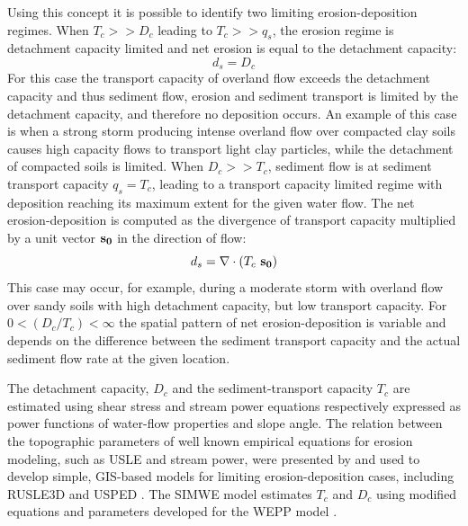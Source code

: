 \documentclass[gmd, manuscript]{copernicus}
\begin{document}
Using this concept it is possible to identify 
two limiting erosion-deposition regimes.
When $T_c >> D_c$ leading to $T_c >> q_s$, 
the erosion regime is detachment capacity limited and
net erosion is equal to the detachment capacity:
\begin{equation}
\label{eq:detachment_limited}
 d_s = D_c
\end{equation}
For this case the transport capacity of overland flow exceeds
the detachment capacity and thus sediment flow,
erosion and sediment transport is limited by the detachment capacity, 
and therefore no deposition occurs.
An example of this case is when a strong storm 
producing intense %
overland flow over compacted clay soils 
causes high capacity flows to transport light clay particles,
while the detachment of compacted soils is limited.
%
When $D_c >> T_c$, sediment flow is at sediment transport capacity $q_s = T_c$, 
leading to a transport capacity limited regime 
with deposition reaching its maximum extent for the given water flow. 
The net erosion-deposition is computed as the divergence of
transport capacity multiplied by a unit vector ${\bf s_0}$ 
in the direction of flow:
\begin{equation}
\label{eq:transport_limited}
 d_s = \nabla\cdot (T_c ~ {\bf s_0})
\end{equation}
This case may occur, for example, during a moderate storm 
with overland flow over sandy soils 
with high detachment capacity, but low transport capacity.
%
For $0 < ({D_c / T_c}) < \infty$ 
the spatial pattern of net erosion-deposition is variable 
and depends on the difference between the sediment transport capacity 
and the actual sediment flow rate at the given location.

The detachment capacity, $D_c $  and the sediment-transport capacity $T_c $  
are estimated using shear stress and stream power equations respectively
expressed as power functions of water-flow properties and slope angle.    
The relation between the topographic parameters 
of well known empirical equations for erosion modeling, 
such as USLE and stream power, were presented by \citep{Moore1986} 
and used to develop simple, GIS-based models for limiting erosion-deposition cases, 
including RUSLE3D and USPED \citep{Mitasova2001}.
The SIMWE model estimates $T_c$ and $D_c$ using modified 
equations and parameters developed for the WEPP model 
\citep{Flanagan2013,Mitasova2001}.
\end{document}
